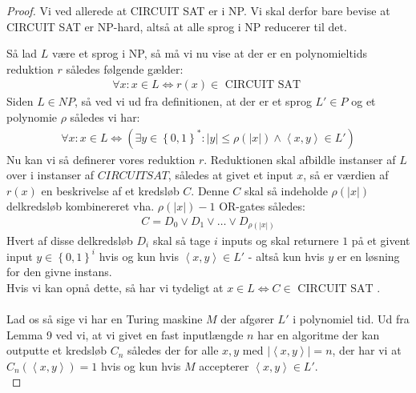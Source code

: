 \begin{proof}
 Vi ved allerede at CIRCUIT SAT er i NP. Vi skal derfor bare bevise at CIRCUIT SAT er NP-hard, altså at alle sprog i NP reducerer til det.

Så lad $L$ være et sprog i NP, så må vi nu vise at der er en polynomieltids reduktion $r$ således følgende gælder:
\begin{align*}
 \forall x: x \in L \Leftrightarrow r(x) \in \text{ CIRCUIT SAT }
\end{align*}
Siden $L \in NP$, så ved vi ud fra definitionen, at der er et sprog $L' \in P$ og et polynomie $\rho$ således vi har:
\begin{align*}
 \forall x : x \in L \Leftrightarrow (\exists y \in \left\lbrace 0,1 \right\rbrace^* : |y| \leq \rho(|x|) \wedge \left\langle x,y \right\rangle \in L')
\end{align*}
Nu kan vi så definerer vores reduktion $r$. Reduktionen skal afbildle instanser af $L$ over i instanser af $CIRCUIT SAT$, således at givet et input $x$, så er værdien af $r(x)$ en beskrivelse af et kredsløb $C$. Denne $C$ skal så indeholde $\rho(|x|)$ delkredsløb kombinereret vha. $\rho(|x|)-1$ OR-gates således:
\begin{align*}
 C = D_0 \vee D_1 \vee \hdots \vee D_{\rho(|x|)}
\end{align*}
Hvert af disse delkredsløb $D_i$ skal så tage $i$ inputs og skal returnere $1$ på et givent input $y \in \left\lbrace 0,1 \right\rbrace^i$ hvis og kun hvis $\left\langle x,y \right\rangle \in L'$ - altså kun hvis $y$ er en løsning for den givne instans.\\

Hvis vi kan opnå dette, så har vi tydeligt at $x \in L \Leftrightarrow C \in \text{ CIRCUIT SAT }$.\\
~\\
Lad os så sige vi har en Turing maskine $M$ der afgører $L'$ i polynomiel tid. Ud fra Lemma 9 ved vi, at vi givet en fast inputlængde $n$ har en algoritme der kan outputte et kredsløb $C_n$ således der for alle $x,y$ med $|\left\langle x,y \right\rangle|=n$, der har vi at $C_n(\left\langle x,y \right\rangle)=1$ hvis og kun hvis $M$ accepterer $\left\langle x,y \right\rangle \in L'$.\\


\end{proof}
